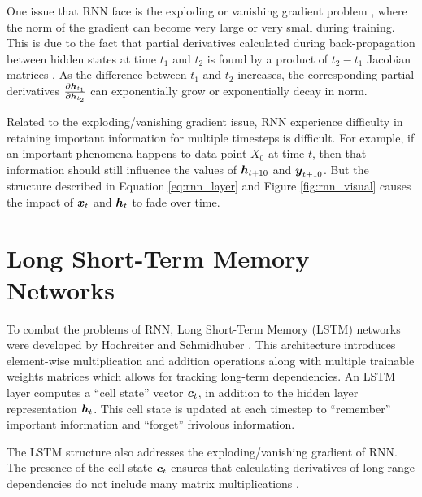 One issue that RNN face is the exploding or vanishing gradient problem \cite{bengio1994}, where the norm of the gradient can become very large or very small during training. This is due to the fact that partial derivatives calculated during back-propagation between hidden states at time $t_1$ and $t_2$ is found by a product of $t_2 - t_1$ Jacobian matrices \cite{pascanu2013}. As the difference between $t_1$ and $t_2$ increases, the corresponding partial derivatives $\frac{\partial \boldsymbol{h}_{t_1}}{\partial \boldsymbol{h}_{t_2}}$ can exponentially grow or exponentially decay in norm.

Related to the exploding/vanishing gradient issue, RNN experience difficulty in retaining important information for multiple timesteps is difficult. For example, if an important phenomena happens to data point $X_0$ at time $t$, then that information should still influence the values of $\boldsymbol{h}_{t+10}$ and $\boldsymbol{y}_{t+10}$. But the structure described in Equation \ref{eq:rnn_layer} and Figure \ref{fig:rnn_visual} causes the impact of $\boldsymbol{x}_t$ and $\boldsymbol{h}_t$ to fade over time.


\section{Long Short-Term Memory Networks}\label{sec:lstm}
To combat the problems of RNN, Long Short-Term Memory (LSTM) networks were developed by Hochreiter and Schmidhuber \cite{hochreiter1997}. This architecture introduces element-wise multiplication and addition operations along with multiple trainable weights matrices which allows for tracking long-term dependencies. An LSTM layer computes a ``cell state'' vector $\boldsymbol{c}_t$, in addition to the hidden layer representation $\boldsymbol{h}_t$. This cell state is updated at each timestep to ``remember'' important information and ``forget'' frivolous information.

The LSTM structure also addresses the exploding/vanishing gradient of RNN. The presence of the cell state $\boldsymbol{c}_t$ ensures that calculating derivatives of long-range dependencies do not include many matrix multiplications \cite{hochreiter1997}.

